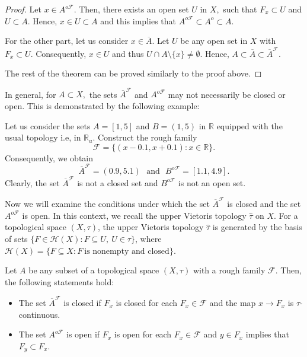 \documentclass[11pt]{amsart}
\begin{document}
\begin{proof}
     Let $x\in A^{o\mathscr{F}}.$ Then, there exists an open set $U$ in $X,$ such that $F_x\subset U$ and $U\subset A.$ Hence, $x\in U\subset A$ and this implies that $A^{o\mathscr{F}}\subset A^{o}\subset A.$ 

     For the other part, let us consider $x\in \overline{A}.$ Let $U$ be any open set in $X$ with $F_x\subset U.$ Consequently, $x\in U$ and thus $U\cap A\setminus\{x\}\neq \emptyset.$ Hence, $A\subset \overline{A}\subset \overline{A}^\mathscr{F}.$  

     The rest of the theorem can be proved similarly to the proof above.
\end{proof} 

In general, for $A\subset X,$ the sets $\overline{A}^\mathscr{F}$ and $A^{o\mathscr{F}}$ may not necessarily be closed or open. This is demonstrated by the following example:

\begin{example}\label{Ex2}
    Let us consider the sets $A=[1,5]$ and $B=(1,5)$ in $\mathbb{R}$ equipped with the usual topology i.e, in $\mathbb{R}_u$. Construct the rough family $$\mathscr{F}=\{(x-0.1,x+0.1): x\in \mathbb{R}\}.$$ Consequently, we obtain 
    $$\overline{A}^\mathscr{F}=(0.9,5.1)~~~\text{and}~~~B^{o\mathscr{F}}=[1.1,4.9].$$
    Clearly, the set $\overline{A}^\mathscr{F}$ is not a closed set and $B^{o\mathscr{F}}$ is not an open set.
\end{example}

Now we will examine the conditions under which the set $\overline{A}^\mathscr{F}$ is closed and the set $A^{o\mathscr{F}}$ is open. In this context, we recall the upper Vietoris topology $\hat{\tau}$ on $X$. For a topological space $(X,\tau)$, the upper Vietoris topology $\hat{\tau}$ is generated by the basis of sets $\{F\in \mathcal{H}(X): F\subseteq U, ~U\in \tau\}$, where $\mathcal{H}(X)=\{F\subseteq X: F~\text{is nonempty and closed}\}$.

\begin{theorem}\label{Th2.2} Let $A$ be any subset of a topological space $(X,\tau)$ with a  rough family $\mathscr{F}$. Then, the following statements hold: 
   \begin{itemize}
       \item[(i)] The set $\overline{A}^\mathscr{F}$ is closed if $F_x$ is closed for each $F_x\in \mathscr{F}$ and the map $x\to F_x$ is $\hat{\tau}$-continuous.

       \item[(ii)]The set $A^{o\mathscr{F}}$ is open if $F_x$ is open for each $F_x\in \mathscr{F}$ and $y\in F_x$ implies that $F_y\subset F_x$.
   \end{itemize} 
\end{theorem}
\end{document}

